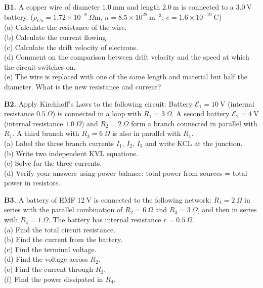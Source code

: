 \begin{exercisebox}[23]
\textbf{B1.} A copper wire of diameter $1.0\ \text{mm}$
and length $2.0\ \text{m}$ is connected to a
$3.0\ \text{V}$ battery.
($\rho_{Cu} = 1.72\times10^{-8}\ \Omega\text{m}$,
$n = 8.5\times10^{28}\ \text{m}^{-3}$,
$e = 1.6\times10^{-19}\ \text{C}$)\\[4pt]
(a) Calculate the resistance of the wire.\\
(b) Calculate the current flowing.\\
(c) Calculate the drift velocity of electrons.\\
(d) Comment on the comparison between drift velocity
and the speed at which the circuit switches on.\\
(e) The wire is replaced with one of the same length
and material but half the diameter. What is the new
resistance and current?
\hfill{}

\vspace{0.4cm}

\textbf{B2.} Apply Kirchhoff's Laws to the following
circuit: Battery $\mathcal{E}_1 = 10\ \text{V}$
(internal resistance $0.5\ \Omega$) is connected
in a loop with $R_1 = 3\ \Omega$. A second battery
$\mathcal{E}_2 = 4\ \text{V}$ (internal resistance
$1.0\ \Omega$) and $R_2 = 2\ \Omega$ form a branch
connected in parallel with $R_1$.
A third branch with $R_3 = 6\ \Omega$ is also
in parallel with $R_1$.\\[4pt]
(a) Label the three branch currents $I_1$, $I_2$,
$I_3$ and write KCL at the junction.\\
(b) Write two independent KVL equations.\\
(c) Solve for the three currents.\\
(d) Verify your answers using power balance:
total power from sources = total power in resistors.
\hfill{}

\vspace{0.4cm}

\textbf{B3.} A battery of EMF $12\ \text{V}$ is
connected to the following network:
$R_1 = 2\ \Omega$ in series with the parallel
combination of $R_2 = 6\ \Omega$ and $R_3 = 3\ \Omega$,
and then in series with $R_4 = 1\ \Omega$.
The battery has internal resistance $r = 0.5\ \Omega$.\\[4pt]
(a) Find the total circuit resistance.\\
(b) Find the current from the battery.\\
(c) Find the terminal voltage.\\
(d) Find the voltage across $R_2$.\\
(e) Find the current through $R_3$.\\
(f) Find the power dissipated in $R_4$.
\hfill{}


\end{exercisebox}
